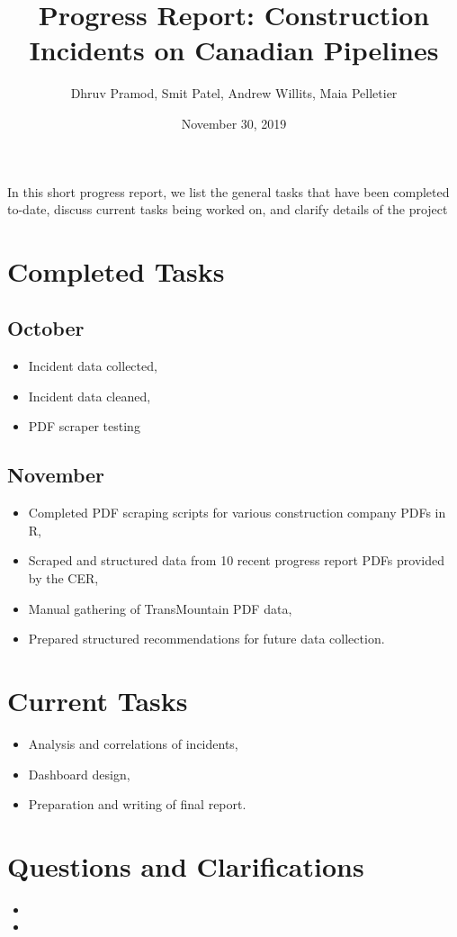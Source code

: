 \documentclass[12pt]{article}
\title{Progress Report: Construction Incidents on Canadian Pipelines}
\author{Dhruv Pramod, Smit Patel, Andrew Willits, Maia Pelletier}
\date{November 30, 2019}
\begin{document}
\maketitle

In this short progress report, we list the general tasks that have been completed to-date, discuss current tasks being worked on, and clarify details of the project

\section{Completed Tasks}
\subsection{October}
\begin{itemize}
    \item Incident data collected,
    \item Incident data cleaned,
    \item PDF scraper testing
\end{itemize}
\subsection{November}
\begin{itemize}
    \item Completed PDF scraping scripts for various construction company PDFs in R,
    \item Scraped and structured data from 10 recent progress report PDFs provided by the CER,
    \item Manual gathering of TransMountain PDF data,
    \item Prepared structured recommendations for future data collection.
\end{itemize}

\section{Current Tasks}
\begin{itemize}
    \item Analysis and correlations of incidents,
    \item Dashboard design,
    \item Preparation and writing of final report.
\end{itemize}

\section{Questions and Clarifications}
\begin{itemize}
    \item 
    \item 
\end{itemize}
\end{document}
